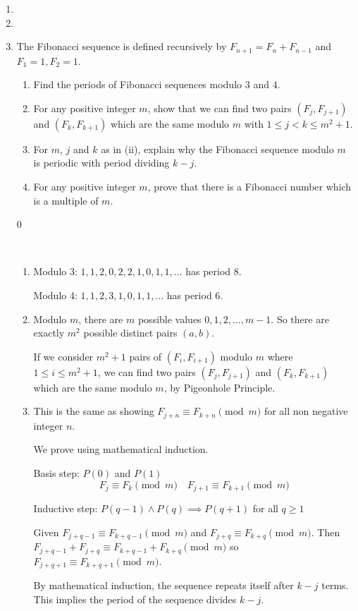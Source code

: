 \begin{enumerate}
\item 
\item 
\item The Fibonacci sequence is defined recursively by $F_{n+1}=F_n+F_{n-1}$ and $F_1=1,F_2=1$.
\begin{enumerate}[label=(\roman*)]
\item Find the periods of Fibonacci sequences modulo $3$ and $4$.
\item For any positive integer $m$, show that we can find two pairs $(F_j,F_{j+1})$ and $(F_k,F_{k+1})$ which are the same modulo $m$ with $1\le j<k\le m^2+1$.
\item For $m$, $j$ and $k$ as in (ii), explain why the Fibonacci sequence modulo $m$ is periodic
with period dividing $k-j$.
\item For any positive integer $m$, prove that there is a Fibonacci number which is a multiple of $m$.
\end{enumerate}0

\begin{solution} \
\begin{enumerate}[label=(\roman*)]
\item Modulo 3: $1, 1, 2, 0, 2, 2, 1, 0, 1, 1, \dots$ has period $8$.

Modulo 4: $1, 1, 2, 3, 1, 0, 1, 1, \dots$ has period $6$.

\item Modulo $m$, there are $m$ possible values $0,1,2,\dots,m-1$. So there are exactly $m^2$ possible distinct pairs $(a,b)$.

If we consider $m^2+1$ pairs of $(F_i,F_{i+1})$ modulo $m$ where $1\le i\le m^2+1$, we can find two pairs $(F_j,F_{j+1})$ and $(F_k,F_{k+1})$ which are the same modulo $m$, by Pigeonhole Principle.

\item This is the same as showing $F_{j+n} \equiv F_{k+n} \pmod m$ for all non negative integer $n$.

We prove using mathematical induction.

Basis step: $P(0)$ and $P(1)$
\[ F_j \equiv F_k \pmod m \quad F_{j+1} \equiv F_{k+1} \pmod m \]

Inductive step: $P(q-1)\land P(q)\implies P(q+1)$ for all $q\ge 1$

Given $F_{j+q-1} \equiv F_{k+q-1} \pmod m$ and $F_{j+q} \equiv F_{k+q} \pmod m$. Then $F_{j+q-1}+F_{j+q} \equiv F_{k+q-1}+F_{k+q}\pmod m$ so $F_{j+q+1}\equiv F_{k+q+1}\pmod m$.

By mathematical induction, the sequence repeats itself after $k-j$ terms. This implies the period of the sequence divides $k-j$.


\end{enumerate}
\end{solution}
\end{enumerate}
